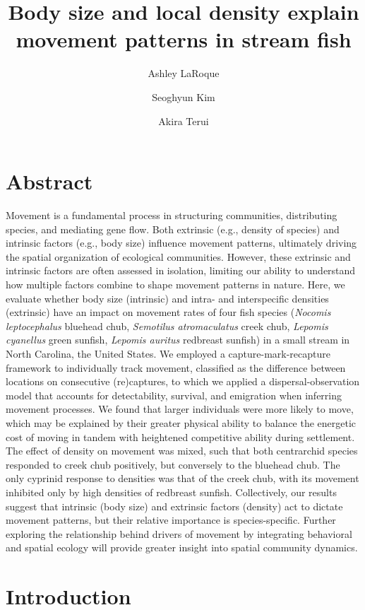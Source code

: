 \documentclass[11pt, class=article, crop=false]{standalone}
\title{Body size and local density explain movement patterns in stream fish}
\date{} %
\author[1]{Ashley LaRoque}
\author[2]{Seoghyun Kim}
\author[1]{Akira Terui}
\affil[1]{Depatment of Biology, University of North Carolina at Greensboro}
\affil[2]{Department of Biological Sciences, Kangwon National University}
\begin{document}
\maketitle

\section{Abstract}

Movement is a fundamental process in structuring communities, distributing species, and mediating gene flow. Both extrinsic (e.g., density of species) and intrinsic factors (e.g., body size) influence movement patterns, ultimately driving the spatial organization of ecological communities. However, these extrinsic and intrinsic factors are often assessed in isolation, limiting our ability to understand how multiple factors combine to shape movement patterns in nature. Here, we evaluate whether body size (intrinsic) and intra- and interspecific densities (extrinsic) have an impact on movement rates of four fish species (\textit{Nocomis leptocephalus} bluehead chub, \textit{Semotilus atromaculatus} creek chub, \textit{Lepomis cyanellus} green sunfish, \textit{Lepomis auritus} redbreast sunfish) in a small stream in North Carolina, the United States. We employed a capture-mark-recapture framework to individually track movement, classified as the difference between locations on consecutive (re)captures, to which we applied a dispersal-observation model that accounts for detectability, survival, and emigration when inferring movement processes. We found that larger individuals were more likely to move, which may be explained by their greater physical ability to balance the energetic cost of moving in tandem with heightened competitive ability during settlement. The effect of density on movement was mixed, such that both centrarchid species responded to creek chub positively, but conversely to the bluehead chub. The only cyprinid response to densities was that of the creek chub, with its movement inhibited only by high densities of redbreast sunfish. Collectively, our results suggest that intrinsic (body size) and extrinsic factors (density) act to dictate movement patterns, but their relative importance is species-specific. Further exploring the relationship behind drivers of movement by integrating behavioral and spatial ecology will provide greater insight into spatial community dynamics. 

\section{Introduction}
\end{document}
